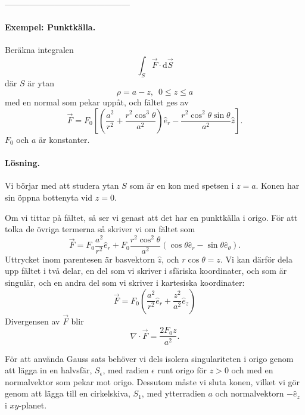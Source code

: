 \documentclass[%
oneside,                 %
final,                   %
10pt]{article}
\begin{document}
\noindent
---------------------------------------------

\paragraph{Exempel: Punktkälla.}


\vspace{3mm}


Beräkna integralen
\begin{equation}
  \int_S \vec{F} \cdot \mbox{d}\vec{S} 
\end{equation}
där $S$ är ytan
\begin{equation}
  \rho = a - z, \,\,\,0 \le z \le a
\end{equation}
med en normal som pekar uppåt, och fältet ges av
\begin{equation}
  \vec{F} = F_0 \left[\left(\frac{a^2}{r^2} + \frac{r^2 \cos^3 \theta}{a^2}
\right) \hat{e}_{r} - \frac{r^2 \cos^2 \theta \sin \theta}{a^2} \hat{z}
\right].
\end{equation}
$F_0$ och $a$ är konstanter.

\paragraph{Lösning.}
Vi börjar med att studera ytan $S$ som är en kon med  spetsen i $z = a$.  Konen har sin öppna bottenyta vid $z = 0$. 

Om vi tittar på fältet, så ser vi genast att det har en punktkälla i origo.  För att tolka de övriga termerna så skriver vi om fältet som
\begin{equation}
  \vec{F} = F_0 \frac{a^2}{r^2}\hat{e}_{r} + F_0 \frac{r^2\cos^2 \theta}{a^2}
\left(\cos \theta \hat{e}_{r} - \sin \theta \hat{e}_{\theta}\right).
\end{equation}
Uttrycket inom parentesen är basvektorn $\hat{z}$, och $r\cos \theta = z$.  Vi kan därför dela upp fältet i två delar, en del som vi skriver i sfäriska koordinater, och som är singulär, och en andra del som vi skriver i kartesiska koordinater:
\begin{equation}
  \vec{F} = F_0 \left(\frac{a^2}{r^2} \hat{e}_{r} + \frac{z^2}{a^2} 
\hat{e}_{z}\right)
\end{equation}
Divergensen av $\vec{F}$ blir
\begin{equation}
  \nabla \cdot \vec{F} = \frac{2 F_0 z}{a^2}.
\end{equation}

För att använda Gauss sats behöver vi dels isolera singulariteten i origo genom att lägga in en halvsfär, $S_\epsilon$, med radien $\epsilon$ runt origo för $z >0$ och med en normalvektor som pekar mot origo.  
Dessutom måste vi sluta konen, vilket vi gör genom att lägga till en cirkelskiva, $S_1$,
med ytterradien $a$ och normalvektorn $-\hat{e}_{z}$ i $xy$-planet.
\end{document}
